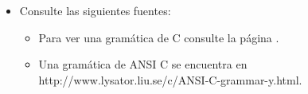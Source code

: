 \begin{itemize}
\item
Consulte las siguientes fuentes:
\begin{itemize}
\item
Para ver una gramática de C consulte la página
.
\item
Una gramática de ANSI C se encuentra en
{http://www.lysator.liu.se/c/ANSI-C-grammar-y.html}.
\end{itemize}
\end{itemize}


